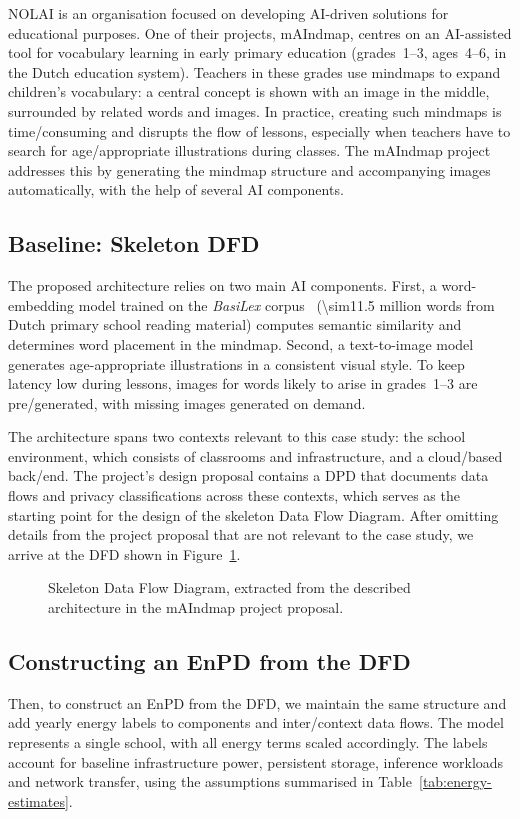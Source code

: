 \documentclass[11pt,a4paper]{article}
\begin{document}
NOLAI is an organisation focused on developing AI-driven solutions for educational purposes.
One of their projects, mAIndmap, centres on an AI-assisted tool for vocabulary learning in early primary education (grades~\numrange{1}{3}, ages~\numrange{4}{6}, in the Dutch education system).
Teachers in these grades use mindmaps to expand children's vocabulary: a central concept is shown with an image in the middle, surrounded by related words and images.
In practice, creating such mindmaps is time\-/consuming and disrupts the flow of lessons, especially when teachers have to search for age\-/appropriate illustrations during classes.
The mAIndmap project addresses this by generating the mindmap structure and accompanying images automatically, with the help of several AI components.

\subsection{Baseline: Skeleton DFD}
The proposed architecture relies on two main AI components.
First, a word-embedding model trained on the \emph{BasiLex} corpus~\cite{tellings2014basilex} (\num{\sim11.5} million words from Dutch primary school reading material) computes semantic similarity and determines word placement in the mindmap.
Second, a text-to-image model generates age-appropriate illustrations in a consistent visual style.
To keep latency low during lessons, images for words likely to arise in grades~\numrange{1}{3} are pre\-/generated, with missing images generated on demand.

The architecture spans two contexts relevant to this case study: the school environment, which consists of classrooms and infrastructure, and a cloud\-/based back\-/end.
The project's design proposal contains a DPD that documents data flows and privacy classifications across these contexts, which serves as the starting point for the design of the skeleton Data Flow Diagram.
After omitting details from the project proposal that are not relevant to the case study, we arrive at the DFD shown in Figure~\ref{fig:dfd}.

\begin{figure}[ht]
  \centering
  \caption{Skeleton Data Flow Diagram, extracted from the described architecture in the mAIndmap project proposal.}%
  \label{fig:dfd}
\end{figure}

\subsection{Constructing an EnPD from the DFD}
Then, to construct an EnPD from the DFD, we maintain the same structure and add yearly energy labels to components and inter\-/context data flows.
The model represents a single school, with all energy terms scaled accordingly.
The labels account for baseline infrastructure power, persistent storage, inference workloads and network transfer, using the assumptions summarised in Table~\ref{tab:energy-estimates}.
\end{document}
